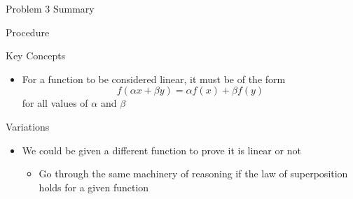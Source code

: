 \begin{summary}{Problem 3 Summary}
\begin{statement}{Procedure}
\begin{enumerate}[label = (\alph*)]
        \end{enumerate}
    \end{statement}
    \begin{statement}{Key Concepts}
        \begin{itemize}
            \item For a function to be considered linear, it must be of the form 
            \begin{equation*}
                f(\alpha x + \beta y) = \alpha f(x) + \beta f(y)
            \end{equation*}
            for all values of $\alpha$ and $\beta$
        \end{itemize}
    \end{statement}
    \begin{statement}{Variations}
        \begin{itemize}
            \item We could be given a different function to prove it is linear or not
            \begin{itemize}
                \item Go through the same machinery of reasoning if the law of superposition holds for a given function
            \end{itemize}
        \end{itemize}
    \end{statement}
\end{summary}

